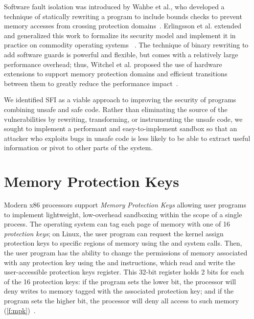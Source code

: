 Software fault isolation was introduced by Wahbe et al., who developed a technique of statically
rewriting a program to include bounds checks to prevent memory accesses from crossing protection
domains~\cite{wahbe:sfi}. Erlingsson et al. extended and generalized this work to formalize its
security model and implement it in practice on commodity operating systems ~\cite{erlingsson:xfi}.
The technique of binary rewriting to add software guards is powerful and flexible, but comes with a
relatively large performance overhead; thus, Witchel et al. proposed the use of hardware extensions
to support memory protection domains and efficient transitions between them to greatly reduce the
performance impact~\cite{witchel:mondiran}.

We identified SFI as a viable approach to improving the security of programs combining unsafe and
safe code. Rather than eliminating the source of the vulnerabilities by rewriting, transforming, or
instrumenting the unsafe code, we sought to implement a performant and easy-to-implement sandbox so
that an attacker who exploits bugs in unsafe code is less likely to be able to extract useful
information or pivot to other parts of the system. 

\section{Memory Protection Keys}

Modern x86 processors support \textit{Memory Protection Keys} allowing user programs to implement
lightweight, low-overhead sandboxing within the scope of a single process. The operating system can
tag each page of memory with one of 16 \textit{protection keys}; on Linux, the user program can
request the kernel assign protection keys to specific regions of memory using the 
and  system calls. Then, the user program has the ability to change the
permissions of memory associated with any protection key using the  and 
instructions, which read and write the user-accessible protection keys register. This 32-bit
register holds 2 bits for each of the 16 protection keys: if the program sets the lower bit, the
processor will deny writes to memory tagged with the associated protection key; and if the program
sets the higher bit, the processor will deny all access to such memory
(\autoref{f:mpk})~\cite{intel:system, linux:mpk}.

